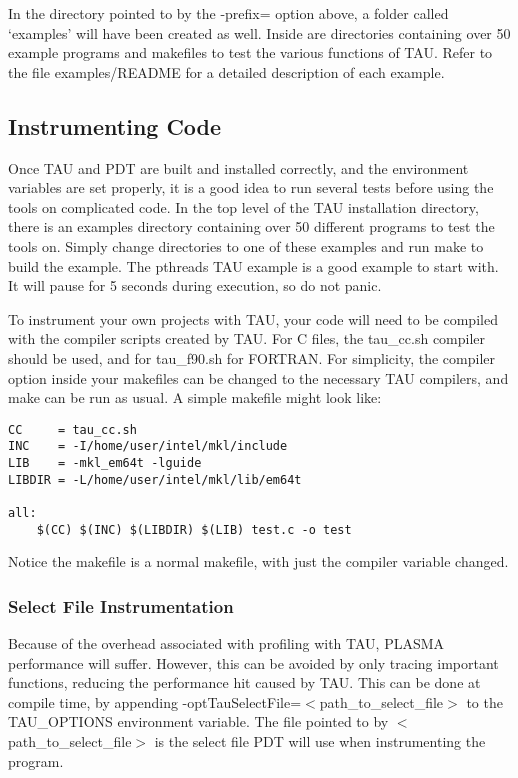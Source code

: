 \documentclass[11pt,letterpaper]{article}
\begin{document}
In the directory pointed to by the -prefix= option above, a folder called `examples' will have been created as well. Inside are directories containing over 50 example programs and makefiles to test the various functions of TAU. Refer to the file examples/README for a detailed description of each example.

\subsection{Instrumenting Code}
Once TAU and PDT are built and installed correctly, and the environment variables are set properly, it is a good idea to run several tests before using the tools on complicated code. In the top level of the TAU installation directory, there is an examples directory containing over 50 different programs to test the tools on. Simply change directories to one of these examples and run make to build the example. The pthreads TAU example is a good example to start with. It will pause for 5 seconds during execution, so do not panic.

To instrument your own projects with TAU, your code will need to be compiled with the compiler scripts created by TAU. For C files, the tau\_cc.sh compiler should be used, and for tau\_f90.sh for FORTRAN. For simplicity, the compiler option inside your makefiles can be changed to the necessary TAU compilers, and make can be run as usual. A simple makefile might look like:

\begin{verbatim}
CC     = tau_cc.sh
INC    = -I/home/user/intel/mkl/include
LIB    = -mkl_em64t -lguide
LIBDIR = -L/home/user/intel/mkl/lib/em64t

all:
    $(CC) $(INC) $(LIBDIR) $(LIB) test.c -o test
\end{verbatim}

Notice the makefile is a normal makefile, with just the compiler variable changed.

\subsubsection{Select File Instrumentation}
Because of the overhead associated with profiling with TAU, PLASMA performance will suffer. However, this can be avoided by only tracing important functions, reducing the performance hit caused by TAU. This can be done at compile time, by appending -optTauSelectFile=$<$path\_to\_select\_file$>$ to the TAU\_OPTIONS environment variable. The file pointed to by $<$path\_to\_select\_file$>$ is the select file PDT will use when instrumenting the program.
\end{document}
